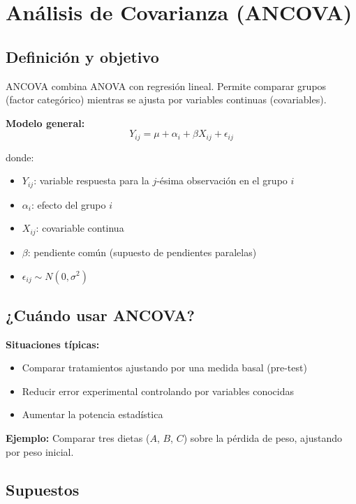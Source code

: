 \documentclass[11pt,a4paper]{article}
\begin{document}
\section{Análisis de Covarianza (ANCOVA)}

\subsection{Definición y objetivo}

ANCOVA combina ANOVA con regresión lineal. Permite comparar grupos (factor categórico) mientras se ajusta por variables continuas (covariables).

\textbf{Modelo general:}
\begin{equation}
Y_{ij} = \mu + \alpha_i + \beta X_{ij} + \epsilon_{ij}
\end{equation}

donde:
\begin{itemize}
    \item $Y_{ij}$: variable respuesta para la $j$-ésima observación en el grupo $i$
    \item $\alpha_i$: efecto del grupo $i$
    \item $X_{ij}$: covariable continua
    \item $\beta$: pendiente común (supuesto de pendientes paralelas)
    \item $\epsilon_{ij} \sim N(0, \sigma^2)$
\end{itemize}

\subsection{¿Cuándo usar ANCOVA?}

\textbf{Situaciones típicas:}
\begin{itemize}
    \item Comparar tratamientos ajustando por una medida basal (pre-test)
    \item Reducir error experimental controlando por variables conocidas
    \item Aumentar la potencia estadística
\end{itemize}

\textbf{Ejemplo:} Comparar tres dietas ($A$, $B$, $C$) sobre la pérdida de peso, ajustando por peso inicial.

\subsection{Supuestos}
\end{document}
